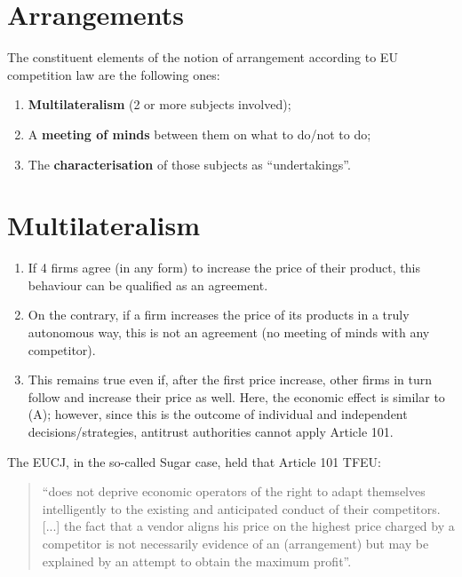 \section*{Arrangements}

    The constituent elements of the notion of arrangement according to EU competition law are the following ones: 

    \begin{enumerate}
        \item \textbf{Multilateralism} (2 or more subjects involved); 
        \item A \textbf{meeting of minds} between them on what to do/not to do; 
        \item The \textbf{characterisation} of those subjects as “undertakings”.
    \end{enumerate}

    \section{Multilateralism}


        \begin{enumerate}
            \item If 4 firms agree (in any form) to increase the price of their product, this behaviour can be qualified as an agreement.
            \item On the contrary, if a firm increases the price of its products in a truly autonomous way, this is not an agreement (no meeting of minds with any competitor).
            \item This remains true even if, after the first price increase, other firms in turn follow and increase their price as well. Here, the economic effect is similar to (A); however, since this is the outcome of individual and independent decisions/strategies, antitrust authorities cannot apply Article 101.
        \end{enumerate}

        The EUCJ, in the so-called Sugar case, held that Article 101 TFEU: 

        \begin{quote}
            “does not deprive economic operators of the right to adapt themselves intelligently to the existing and anticipated conduct of their competitors. [...] the fact that a vendor aligns his price on the highest price charged by a competitor is not necessarily evidence of an (arrangement) but may be explained by an attempt to obtain the maximum profit”.
        \end{quote}

